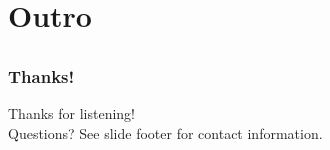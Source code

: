\documentclass[t]{beamer}
\begin{document}


\section{Outro}

\subsection{}

\begin{frame}
	\frametitle{Thanks!}
		\begin{center}
			\vfill
			Thanks for listening!\\
			\vfill
			Questions?
			\vfill
			See slide footer for contact information.
			\vfill
		\end{center}
\end{frame}
\end{document}
